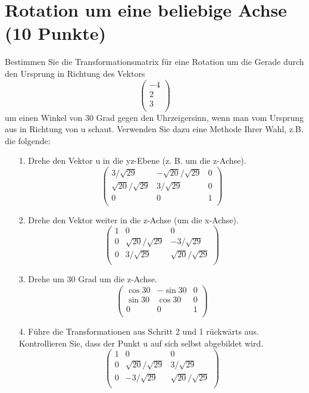 \documentclass[11pt]{article}
\begin{document}
\section{Rotation um eine beliebige Achse (10 Punkte)}
Bestimmen Sie die Transformationsmatrix für eine Rotation um die Gerade durch den
Ursprung in Richtung des Vektors
$$
\begin{pmatrix}
-4 \\ 2 \\ 3 \\
\end{pmatrix}
$$
um einen Winkel von 30 Grad gegen den Uhrzeigersinn, wenn man vom Ursprung aus in
Richtung von u schaut. Verwenden Sie dazu eine Methode Ihrer Wahl, z.B. die folgende:
\begin{enumerate}
\item[1.] Drehe den Vektor u in die yz-Ebene (z. B. um die z-Achse).
$$
\begin{pmatrix}
3/ \sqrt{29} & -\sqrt{20}/\sqrt{29} & 0 \\
\sqrt{20}/\sqrt{29} & 3/ \sqrt{29} & 0 \\
0 & 0 & 1 \\
\end{pmatrix}
$$
\item[2.] Drehe den Vektor weiter in die z-Achse (um die x-Achse).
$$
\begin{pmatrix}
1 & 0 & 0 \\
0 & \sqrt{20}/\sqrt{29} & -3/ \sqrt{29}\\
0 & 3/ \sqrt{29} & \sqrt{20}/\sqrt{29} \\
\end{pmatrix}
$$
\item[3.] Drehe um 30 Grad um die z-Achse.
$$
\begin{pmatrix}
\cos 30 & -\sin 30 & 0 \\
\sin 30 & \cos 30 & 0 \\
0 & 0 & 1 \\
\end{pmatrix}
$$
\item[4.] Führe die Transformationen aus Schritt 2 und 1 rückwärts aus. Kontrollieren Sie, dass der Punkt u auf sich selbst abgebildet wird.
$$
\begin{pmatrix}
1 & 0 & 0 \\
0 & \sqrt{20}/\sqrt{29} & 3/ \sqrt{29}\\
0 & -3/ \sqrt{29} & \sqrt{20}/\sqrt{29} \\
\end{pmatrix}
$$

\end{enumerate}
\end{document}
